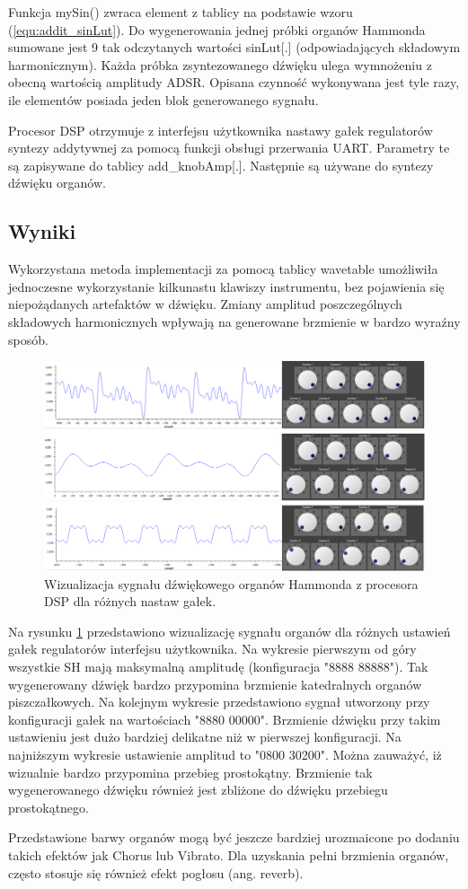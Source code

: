 Funkcja mySin() zwraca element z tablicy na podstawie wzoru (\ref{equ:addit_sinLut}). Do wygenerowania jednej próbki organów Hammonda sumowane jest 9 tak odczytanych wartości sinLut[.] (odpowiadających składowym harmonicznym). Każda próbka zsyntezowanego dźwięku ulega wymnożeniu z obecną wartością amplitudy ADSR. Opisana czynność wykonywana jest tyle razy, ile elementów posiada jeden blok generowanego sygnału.

Procesor DSP otrzymuje z interfejsu użytkownika nastawy gałek regulatorów syntezy addytywnej za pomocą funkcji obsługi przerwania UART. Parametry te są zapisywane do tablicy add\_knobAmp[.]. Następnie są używane do syntezy dźwięku organów.

\subsection{Wyniki}
Wykorzystana metoda implementacji za pomocą tablicy wavetable umożliwiła jednoczesne wykorzystanie kilkunastu klawiszy instrumentu, bez pojawienia się niepożądanych artefaktów w dźwięku. Zmiany amplitud poszczególnych składowych harmonicznych wpływają na generowane brzmienie w bardzo wyraźny sposób.

\begin{figure}[H]
	\centering
	\includegraphics[width=15cm]{grafiki/add_hammond_dsp}
	\captionsetup{justification=centering}
	\caption{Wizualizacja sygnału dźwiękowego organów Hammonda z procesora DSP dla różnych nastaw gałek.}
	\label{rys:add_hammond_dsp}
\end{figure}

Na rysunku \ref{rys:add_hammond_dsp} przedstawiono wizualizację sygnału organów dla różnych ustawień gałek regulatorów interfejsu użytkownika. Na wykresie pierwszym od góry wszystkie SH mają maksymalną amplitudę (konfiguracja "8888 88888"). Tak wygenerowany dźwięk bardzo przypomina brzmienie katedralnych organów piszczałkowych. Na kolejnym wykresie przedstawiono sygnał utworzony przy konfiguracji gałek na wartościach "8880 00000". Brzmienie dźwięku przy takim ustawieniu jest dużo bardziej delikatne niż w pierwszej konfiguracji. Na najniższym wykresie ustawienie amplitud to "0800 30200". Można zauważyć, iż wizualnie bardzo przypomina przebieg prostokątny. Brzmienie tak wygenerowanego dźwięku również jest zbliżone do dźwięku przebiegu prostokątnego.

Przedstawione barwy organów mogą być jeszcze bardziej urozmaicone po dodaniu takich efektów jak Chorus lub Vibrato. Dla uzyskania pełni brzmienia organów, często stosuje się również efekt pogłosu (ang. reverb).